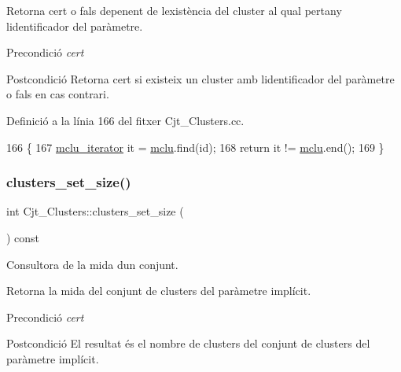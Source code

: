 Retorna cert o fals depenent de l\textquotesingle{}existència del cluster al qual pertany l\textquotesingle{}identificador del paràmetre.

\begin{DoxyPrecond}{Precondició}
{\itshape cert} 
\end{DoxyPrecond}
\begin{DoxyPostcond}{Postcondició}
Retorna cert si existeix un cluster amb l\textquotesingle{}identificador del paràmetre o fals en cas contrari. 
\end{DoxyPostcond}


Definició a la línia 166 del fitxer Cjt\+\_\+\+Clusters.\+cc.


\begin{DoxyCode}
166                                           \{
167     \hyperlink{class_cjt___clusters_ad9cf46a8e1e6430c7b34b184f2756054}{mclu\_iterator} it = \hyperlink{class_cjt___clusters_a5f5e13255bca1fac2ad65c51473f6ead}{mclu}.find(\textcolor{keywordtype}{id});
168     \textcolor{keywordflow}{return} it != \hyperlink{class_cjt___clusters_a5f5e13255bca1fac2ad65c51473f6ead}{mclu}.end();
169 \}
\end{DoxyCode}
\mbox{\label{class_cjt___clusters_a1ecfc9a82c3a0dff467769880c355efd}} 
\subsubsection{\texorpdfstring{clusters\+\_\+set\+\_\+size()}{clusters\_set\_size()}}
{\footnotesize\ttfamily int Cjt\+\_\+\+Clusters\+::clusters\+\_\+set\+\_\+size (\begin{DoxyParamCaption}{ }\end{DoxyParamCaption}) const}



Consultora de la mida d\textquotesingle{}un conjunt. 

Retorna la mida del conjunt de clusters del paràmetre implícit.

\begin{DoxyPrecond}{Precondició}
{\itshape cert} 
\end{DoxyPrecond}
\begin{DoxyPostcond}{Postcondició}
El resultat és el nombre de clusters del conjunt de clusters del paràmetre implícit. 
\end{DoxyPostcond}


